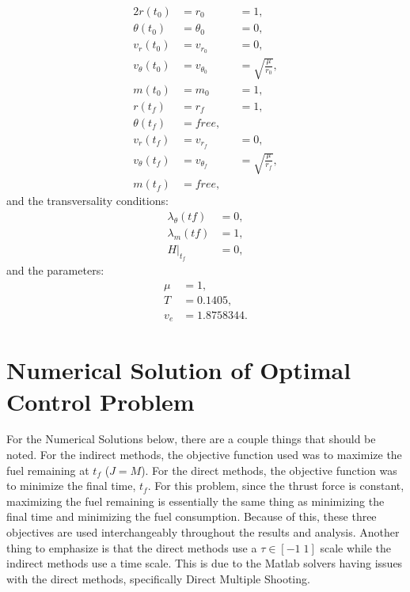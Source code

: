 \documentclass[]{article}
\begin{document}
\begin{alignat*}{2}                                                                                                                                                                        
r(t_0)          &= r_0          &  &= 1, \\
\theta(t_0)     &= \theta_0     &  &= 0, \\
v_r(t_0)        &= v_{r_0}      &  &= 0, \\
v_{\theta}(t_0) &= v_{\theta_0} &  &= \sqrt{\frac{\mu}{r_0}}, \\
m(t_0)          &= m_0          &  &= 1,\\
r(t_f)          &= r_f          &  &= 1,\\
\theta(t_f)     &= free,        &  & \\
v_r(t_f)        &= v_{r_f}      &  &= 0, \\
v_{\theta}(t_f) &= v_{\theta_f} &  &=\sqrt{\frac{\mu}{r_f}},\\
m(t_f)          &= free,         &  & 
\end{alignat*}
and the transversality conditions:
\begin{align*}
	\lambda_\theta(tf) &= 0, \\
	\lambda_m(tf) &= 1, \\
	H|_{t_f}   &= 0,
\end{align*}
and the parameters:
\begin{align*}
	\mu &= 1, \\
	T   &= 0.1405, \\
	v_e &= 1.8758344.
\end{align*}

\section{Numerical Solution of Optimal Control Problem}
For the Numerical Solutions below, there are a couple things that should be noted. For the indirect methods, the objective function used was to maximize the fuel remaining at \(t_f\) (\(J = M\)). For the direct methods, the objective function was to minimize the final time, \(t_f\). For this problem, since the thrust force is constant, maximizing the fuel remaining is essentially the same thing as minimizing the final time and minimizing the fuel consumption. Because of this, these three objectives are used interchangeably throughout the results and analysis. Another thing to emphasize is that the direct methods use a \(\tau \in [-1\; 1]\) scale while the indirect methods use a time scale. This is due to the Matlab solvers having issues with the direct methods, specifically Direct Multiple Shooting.
\end{document}
